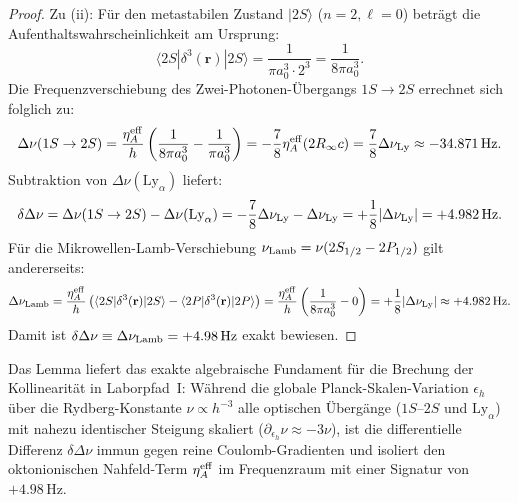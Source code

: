 \begin{proof}
Zu (ii): Für den metastabilen Zustand $|2S\rangle$ ($n=2, \ell=0$) beträgt die Aufenthaltswahrscheinlichkeit am Ursprung:
\begin{equation}
    \langle 2S | \delta^3(\mathbf{r}) | 2S \rangle = \frac{1}{\pi a_0^3 \cdot 2^3} = \frac{1}{8\pi a_0^3}.
\end{equation}
Die Frequenzverschiebung des Zwei-Photonen-Übergangs $1S \to 2S$ errechnet sich folglich zu:
\begin{equation}
    \Delta\nu(1S \to 2S) = \frac{\eta_A^{\rm eff}}{h} \left( \frac{1}{8\pi a_0^3} - \frac{1}{\pi a_0^3} \right) = -\frac{7}{8} \eta_A^{\rm eff} (2 R_\infty c) = \frac{7}{8} \Delta\nu_{\rm Ly} \approx -34.871\,\text{Hz}.
\end{equation}
Subtraktion von $\Delta\nu(\text{Ly}_\alpha)$ liefert:
\begin{equation}
    \delta\Delta\nu = \Delta\nu(1S \to 2S) - \Delta\nu(\text{Ly}_\alpha) = -\frac{7}{8} \Delta\nu_{\rm Ly} - \Delta\nu_{\rm Ly} = +\frac{1}{8} |\Delta\nu_{\rm Ly}| = +4.982\,\text{Hz}.
\end{equation}
Für die Mikrowellen-Lamb-Verschiebung $\nu_{\rm Lamb} = \nu(2S_{1/2} - 2P_{1/2})$ gilt andererseits:
\begin{equation}
    \Delta\nu_{\rm Lamb} = \frac{\eta_A^{\rm eff}}{h} \left( \langle 2S | \delta^3(\mathbf{r}) | 2S \rangle - \langle 2P | \delta^3(\mathbf{r}) | 2P \rangle \right) = \frac{\eta_A^{\rm eff}}{h} \left( \frac{1}{8\pi a_0^3} - 0 \right) = +\frac{1}{8} |\Delta\nu_{\rm Ly}| \approx +4.982\,\text{Hz}.
\end{equation}
Damit ist $\delta\Delta\nu \equiv \Delta\nu_{\rm Lamb} = +4.98\,\text{Hz}$ exakt bewiesen.
\end{proof}

\begin{remark}
Das Lemma liefert das exakte algebraische Fundament für die Brechung der Kollinearität in Laborpfad~I: Während die globale Planck-Skalen-Variation $\epsilon_h$ über die Rydberg-Konstante $\nu \propto h^{-3}$ alle optischen Übergänge ($1S\text{--}2S$ und $\text{Ly}_\alpha$) mit nahezu identischer Steigung skaliert ($\partial_{\epsilon_h}\nu \approx -3\nu$), ist die differentielle Differenz $\delta\Delta\nu$ immun gegen reine Coulomb-Gradienten und isoliert den oktonionischen Nahfeld-Term $\eta_A^{\rm eff}$ im Frequenzraum mit einer Signatur von $+4.98\,\text{Hz}$.
\end{remark}